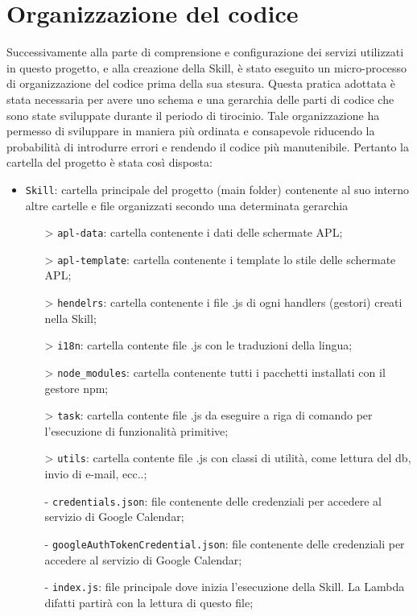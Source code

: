 \section{Organizzazione del codice}
Successivamente alla parte di comprensione e configurazione dei servizi utilizzati in questo progetto, e alla creazione della Skill, è stato eseguito un micro-processo di organizzazione del codice prima della sua stesura. Questa pratica adottata è stata necessaria per avere uno schema e una gerarchia delle parti di codice che sono state sviluppate durante il periodo di tirocinio. Tale organizzazione ha permesso di sviluppare in maniera più ordinata e consapevole riducendo la probabilità di introdurre errori e rendendo il codice più manutenibile. Pertanto la cartella del progetto è stata così disposta:
\begin{itemize}
        \item \texttt{Skill}: cartella principale del progetto (main folder) contenente al suo interno altre cartelle e file organizzati secondo una determinata gerarchia
        \begin{itemize}
            \item[>] \texttt{apl-data}: cartella contenente i dati delle schermate APL;
            \item[>] \texttt{apl-template}: cartella contenente i template lo stile delle schermate APL;
            \item[>] \texttt{hendelrs}: cartella contenente i file .js di ogni handlers (gestori) creati nella Skill;
            \item[>] \texttt{i18n}: cartella contente file .js con le traduzioni della lingua;
            \item[>] \texttt{node\_modules}: cartella contenente tutti i pacchetti installati con il gestore npm;
            \item[>] \texttt{task}: cartella contente file .js da eseguire a riga di comando per l'esecuzione di funzionalità primitive;
            \item[>] \texttt{utils}: cartella contente file .js con classi di utilità, come lettura del db, invio di e-mail, ecc..;
            \item[-] \texttt{credentials.json}: file contenente delle credenziali per accedere al servizio di Google Calendar;
            \item[-] \texttt{googleAuthTokenCredential.json}: file contenente delle credenziali per accedere al servizio di Google Calendar;
            \item[-] \texttt{index.js}: file principale dove inizia l'esecuzione della Skill. La Lambda difatti partirà con la lettura di questo file;

\end{itemize}
\end{itemize}
